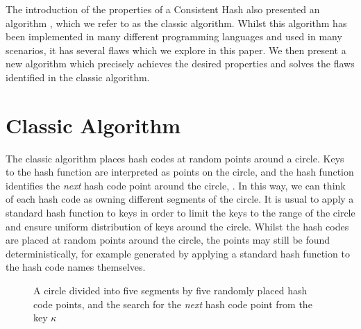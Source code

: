 \documentclass[runningheads,a4paper]{llncs}
\newcommand{\slice}[3]{

  \draw (0,0) -- (#1:1) arc (#1:#2:1);
  \draw (0,0) -- (#1:1.1);

  \node at (#1:1.3) {#3};
}
\begin{document}
The introduction of the properties of a Consistent Hash also presented
an algorithm \cite{Karger1997}, which we refer to as the classic
algorithm. Whilst this algorithm has been implemented in many
different programming languages and used in many scenarios, it has
several flaws which we explore in this paper. We then present a new
algorithm which precisely achieves the desired properties and solves
the flaws identified in the classic algorithm.


\section{Classic Algorithm}

The classic algorithm places hash codes at random points around a
circle. Keys to the hash function are interpreted as points on the
circle, and the hash function identifies the {\em next} hash code
point around the circle, . In this way, we can
think of each hash code as owning different segments of the circle. It
is usual to apply a standard hash function to keys in order to limit
the keys to the range of the circle and ensure uniform distribution of
keys around the circle. Whilst the hash codes are placed at random
points around the circle, the points may still be found
deterministically, for example generated by applying a standard hash
function to the hash code names themselves.

\begin{figure}
\begin{center}
\end{center}
\caption{A circle divided into five segments by five randomly placed
  hash code points, and the search for the {\em next} hash code point
  from the key $\kappa$}
\label{fig:circle-simple}
\end{figure}
\end{document}
